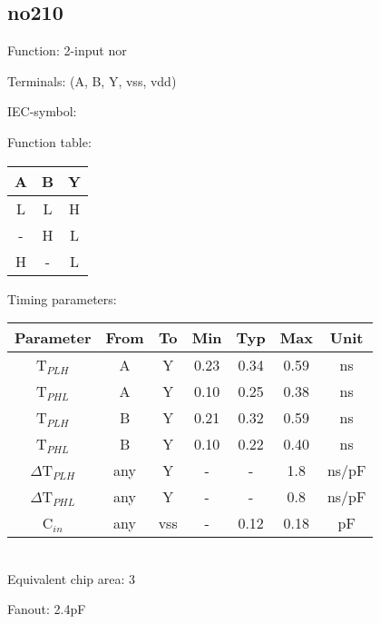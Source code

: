\subsection{no210}

Function: 2-input nor

Terminals: (A, B, Y, vss, vdd)


IEC-symbol:
\begin{figure}[bth]
\end{figure}

\begin{minipage}[t]{0.3\textwidth}
Function table:\\

\begin{tabular}{|c|c||c|}
\hline
A	&B	&Y\\
\hline
L	&L	&H\\
-	&H	&L\\
H	&-	&L\\
\hline
\end{tabular}
\end{minipage}
\hfill
\begin{minipage}[t]{0.6\textwidth}
Timing parameters:\\

\begin{tabular}{|c|cc|ccc|c|}
\hline
Parameter		&From	&To	&Min	&Typ	&Max	&Unit\\
\hline
T$_{PLH}$               &A     	&Y      &0.23	&0.34	&0.59   &ns\\
T$_{PHL}$               &A    	&Y      &0.10	&0.25	&0.38   &ns\\
T$_{PLH}$               &B     	&Y      &0.21	&0.32	&0.59   &ns\\
T$_{PHL}$               &B    	&Y      &0.10	&0.22	&0.40   &ns\\
\hline
$\Delta$T$_{PLH}$       &any    &Y      &-	&-	&1.8   &ns/pF\\
$\Delta$T$_{PHL}$       &any    &Y      &-	&-	&0.8   &ns/pF\\
\hline
C$_{in}$                &any	&vss    &-	&0.12	&0.18   &pF\\
\hline
\end{tabular}
\end{minipage}
\\

Equivalent chip area: 3

Fanout: 2.4pF


\clearpage
